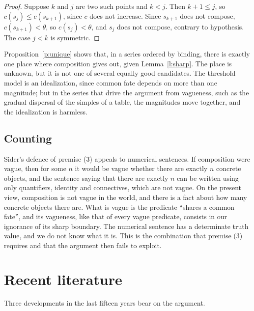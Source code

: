 \documentclass{situationist-preprint}
\begin{document}
\begin{proof}
Suppose $k$ and $j$ are two such points and $k < j$. Then $k + 1 \le j$, so $c(s_j) \le c(s_{k+1})$, since $c$ does not increase. Since $s_{k+1}$ does not compose, $c(s_{k+1}) < \theta$, so $c(s_j) < \theta$, and $s_j$ does not compose, contrary to hypothesis. The case $j < k$ is symmetric.
\end{proof}

Proposition~\ref{p:unique} shows that, in a series ordered by binding, there is exactly one place where composition gives out, given Lemma~\ref{l:sharp}. The place is unknown, but it is not one of several equally good candidates. The threshold model is an idealization, since common fate depends on more than one magnitude; but in the series that drive the argument from vagueness, such as the gradual dispersal of the simples of a table, the magnitudes move together, and the idealization is harmless.

\subsection{Counting}

Sider's defence of premise (3) appeals to numerical sentences. If composition were vague, then for some $n$ it would be vague whether there are exactly $n$ concrete objects, and the sentence saying that there are exactly $n$ can be written using only quantifiers, identity and connectives, which are not vague. On the present view, composition is not vague in the world, and there is a fact about how many concrete objects there are. What is vague is the predicate \enquote{shares a common fate}, and its vagueness, like that of every vague predicate, consists in our ignorance of its sharp boundary. The numerical sentence has a determinate truth value, and we do not know what it is. This is the combination that premise (3) requires and that the argument then fails to exploit.

\section{Recent literature}

Three developments in the last fifteen years bear on the argument.
\end{document}
